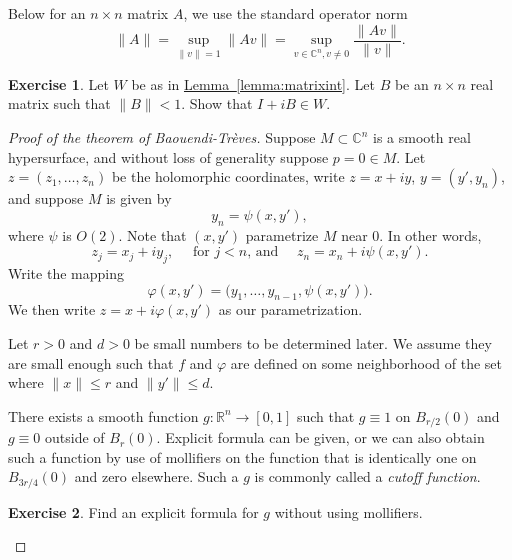 \documentclass[12pt,openany]{book}
\newcommand{\snorm}[1]{\lVert {#1} \rVert}
\newcommand{\C}{{\mathbb{C}}}
\newcommand{\R}{{\mathbb{R}}}
\newcommand{\myindex}[1]{#1\index{#1}}
\theoremstyle{plain}
\theoremstyle{remark}
\theoremstyle{definition}
\newenvironment{exbox}{%
    \def\FrameCommand{\vrule width 1pt \relax\hspace {10pt}}%
    \MakeFramed {\advance \hsize -\width \FrameRestore }%
}{%
    \endMakeFramed
}
\theoremstyle{exercise}
\newtheorem{exercise}{Exercise}[section]
\theoremstyle{example}
\newcommand{\lemmaref}[1]{\hyperref[#1]{Lemma~\ref*{#1}}}
\begin{document}
Below for an $n \times n$ matrix $A$, we use the standard operator norm
\begin{equation*}
\snorm{A} = \sup_{\snorm{v}=1} \snorm{Av} = \sup_{v \in \C^n, v\not= 0}
\frac{\snorm{Av}}{\snorm{v}} .
\end{equation*}

\begin{exbox}
\begin{exercise}
Let $W$ be as in \lemmaref{lemma:matrixint}.  Let $B$ be an $n \times n$
real matrix such that $\snorm{B} < 1$.   Show that $I + iB \in W$.
\end{exercise}
\end{exbox}

\begin{proof}[Proof of the theorem of Baouendi-Tr{\`e}ves]
Suppose $M \subset \C^n$ is a smooth real hypersurface, and without loss
of generality suppose $p=0 \in M$.
Let $z=(z_1,\ldots,z_n)$ be the holomorphic coordinates, write $z=x+iy$,
$y=(y',y_n)$, and
suppose $M$ is given by
\begin{equation*}
y_n = \psi(x,y') ,
\end{equation*}
where $\psi$ is $O(2)$.
Note that $(x,y')$ parametrize $M$ near 0.  In other words,
\begin{equation*}
z_j = x_j+iy_j , \quad \text{ for $j < n$, and } \quad
z_n = x_n + i \psi(x,y') .
\end{equation*}
Write the mapping
\begin{equation*}
\varphi(x,y') = \bigl(y_1,\ldots,y_{n-1},\psi(x,y')\bigr) .
\end{equation*}
We then write $z = x + i\varphi(x,y')$ as our parametrization.

Let $r > 0$ and $d > 0$ be small numbers to be determined later.
We assume they are small enough such
that $f$ and $\varphi$ are defined on some neighborhood of the
set where $\snorm{x} \leq r$ and $\snorm{y'} \leq d$.

There exists a smooth function $g \colon \R^n \to [0,1]$ such that $g \equiv 1$ on
$B_{r/2}(0)$ and $g \equiv 0$ outside of $B_{r}(0)$.  Explicit formula
can be given, or we can also obtain such a function by use of
mollifiers on the function that is identically one on
$B_{3r/4}(0)$ and zero elsewhere.  Such a $g$ is commonly called a
\emph{\myindex{cutoff function}}.

\begin{exbox}
\begin{exercise}
Find an explicit formula for $g$ without using mollifiers.
\end{exercise}
\end{exbox}


\end{proof}
\end{document}
